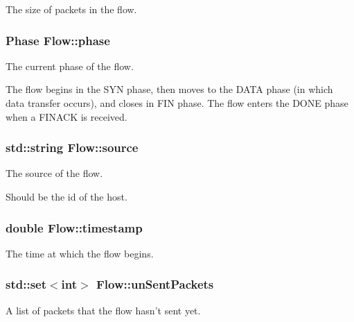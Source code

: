 \-The size of packets in the flow. 

\hypertarget{classFlow_a56615b49301aaddf4cab4fa3f878c5a7}{
\subsubsection[{phase}]{\setlength{\rightskip}{0pt plus 5cm}\-Phase {\bf \-Flow\-::phase}}}\label{classFlow_a56615b49301aaddf4cab4fa3f878c5a7}


\-The current phase of the flow. 

\-The flow begins in the \-S\-Y\-N phase, then moves to the \-D\-A\-T\-A phase (in which data transfer occurs), and closes in \-F\-I\-N phase. \-The flow enters the \-D\-O\-N\-E phase when a \-F\-I\-N\-A\-C\-K is received. \hypertarget{classFlow_a36eb3e23b0804647c30be41835b790b3}{
\subsubsection[{source}]{\setlength{\rightskip}{0pt plus 5cm}std\-::string {\bf \-Flow\-::source}}}\label{classFlow_a36eb3e23b0804647c30be41835b790b3}


\-The source of the flow. 

\-Should be the id of the host. \hypertarget{classFlow_a502b4455d485a1a0325d21d246183bb1}{
\subsubsection[{timestamp}]{\setlength{\rightskip}{0pt plus 5cm}double {\bf \-Flow\-::timestamp}}}\label{classFlow_a502b4455d485a1a0325d21d246183bb1}


\-The time at which the flow begins. 

\hypertarget{classFlow_aef2aa1abe7872f9f75f24c482c5f20f9}{
\subsubsection[{un\-Sent\-Packets}]{\setlength{\rightskip}{0pt plus 5cm}std\-::set$<$int$>$ {\bf \-Flow\-::un\-Sent\-Packets}}}\label{classFlow_aef2aa1abe7872f9f75f24c482c5f20f9}


\-A list of packets that the flow hasn't sent yet. 

